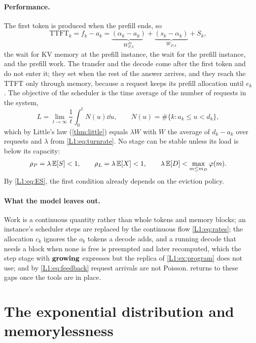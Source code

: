 \paragraph{Performance.} The first token is produced when the prefill ends, so
\begin{equation}\label{L1:eq:ttft}
  \mathrm{TTFT}_k=f_k-a_k
  ={\underbrace{(\alpha_k-a_k)}_{W^M_{P,k}}}
  +{\underbrace{(s_k-\alpha_k)}_{W_{P,k}}}+S_k,
\end{equation}
the wait for KV memory at the prefill instance, the wait for the prefill instance, and
the prefill work. The transfer and the decode come after the first token and do not
enter it; they set when the rest of the answer arrives, and they reach the TTFT only
through memory, because a request keeps its prefill allocation until $e_k$. The
objective of the scheduler is the time average of the number of requests in the
system,
\[
  L=\lim_{t\to\infty}\frac1t\int_0^t N(u)\dd u,\qquad N(u)=\#\{k:a_k\le u<d_k\},
\]
which by Little's law (\cref{thm:little}) equals $\lambda W$ with $W$ the average of
$d_k-a_k$ over requests and $\lambda$ from \eqref{L1:eq:turnrate}. No stage can be
stable unless its load is below its capacity:
\begin{equation}\label{L1:eq:stable}
  \rho_P=\lambda\,\mathbb{E}[S]<1,\qquad \rho_L=\lambda\,\mathbb{E}[X]<1,\qquad
  \lambda\,\mathbb{E}[D]<\max_{m\le m_D}\varphi(m).
\end{equation}
By \eqref{L1:eq:ES}, the first condition already depends on the eviction policy.

\paragraph{What the model leaves out.} Work is a continuous quantity rather than whole
tokens and memory blocks; an instance's scheduler steps are replaced by the continuous
flow \eqref{L1:eq:rates}; the allocation $c_k$ ignores the $o_k$ tokens a decode adds,
and a running decode that needs a block when none is free is preempted and later
recomputed, which the step stage with $\mathbf{growing}$ expresses but the replica of
\cref{L1:ex:program} does not use; and by \eqref{L1:eq:feedback}
request arrivals are not Poisson.  returns to these gaps once the tools
are in place.

\section{The exponential distribution and memorylessness}

